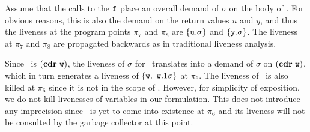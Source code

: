 \documentclass[10pt]{sigplanconf}
\begin{document}
Assume that the calls to the $\mbox{\tt f}$ place an overall demand of $\sigma$
on the body  of \pf.  For obvious reasons, this is  also the demand on
the return  values $u$ and $y$,  and thus the liveness  at the program
points  $\pi_7$  and  $\pi_8$  are $\lbrace  \mbox{\tt u}.\sigma  \rbrace$  and
$\{\mbox{\tt y}.\sigma\}$.  The liveness at  $\pi_7$ and $\pi_8$ are propagated
backwards as in traditional liveness analysis.

Since   \pu\  is  $(\mbox{$\mathbf{cdr}$}~   \mbox{\tt w})$,  the   liveness  of   $\sigma$  for
\pu\ translates  into a demand  of $\sigma$ on $(\mbox{$\mathbf{cdr}$}~\mbox{\tt w})$,  which in
turn generates  a liveness of $\{\mbox{\tt w},~\mbox{\tt w}.1\sigma\}$  at $\pi_6$.  The
liveness of  \pu\ is  also killed at  $\pi_6$ since  it is not  in the
scope of \pu.   However, for simplicity of exposition,  we do not kill
livenesses of  variables in our formulation.  This  does not introduce
any imprecision  since \pu\ is yet  to come into  existence at $\pi_6$
and its  liveness will  not be consulted  by the garbage  collector at
this point.
\end{document}
